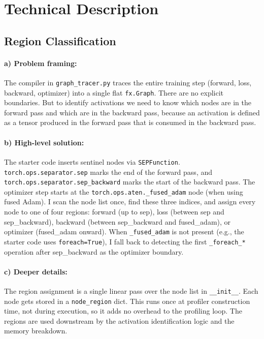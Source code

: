 \documentclass[11pt]{article}
\begin{document}
\section{Technical Description}

\subsection{Region Classification}

\paragraph{a) Problem framing:} The compiler in \texttt{graph\_tracer.py} traces the entire training step (forward, loss, backward, optimizer) into a single flat \texttt{fx.Graph}. There are no explicit boundaries. But to identify activations we need to know which nodes are in the forward pass and which are in the backward pass, because an activation is defined as a tensor produced in the forward pass that is consumed in the backward pass.

\paragraph{b) High-level solution:} The starter code inserts sentinel nodes via \texttt{SEPFunction}. \texttt{torch.ops.separator.sep} marks the end of the forward pass, and \texttt{torch.ops.separator.sep\_backward} marks the start of the backward pass. The optimizer step starts at the \texttt{torch.ops.aten.\_fused\_adam} node (when using fused Adam). I scan the node list once, find these three indices, and assign every node to one of four regions: forward (up to sep), loss (between sep and sep\_backward), backward (between sep\_backward and fused\_adam), or optimizer (fused\_adam onward). When \texttt{\_fused\_adam} is not present (e.g., the starter code uses \texttt{foreach=True}), I fall back to detecting the first \texttt{\_foreach\_*} operation after sep\_backward as the optimizer boundary.

\paragraph{c) Deeper details:} The region assignment is a single linear pass over the node list in \texttt{\_\_init\_\_}. Each node gets stored in a \texttt{node\_region} dict. This runs once at profiler construction time, not during execution, so it adds no overhead to the profiling loop. The regions are used downstream by the activation identification logic and the memory breakdown.
\end{document}

